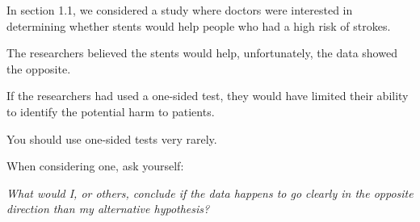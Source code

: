 \documentclass{beamer}
\begin{document}
\begin{frame}
  \begin{example}
    In section 1.1, we considered a study where doctors were interested in determining whether stents would help people who had a high risk of strokes.\pause

    \vspace{1mm}
    The researchers believed the stents would help, unfortunately, the data showed the opposite.\pause

    \vspace{1mm}
    If the researchers had used a one-sided test, they would have limited their ability to identify the potential harm to patients.
  \end{example}\pause

  \begin{note}
    You should use one-sided tests very rarely.\pause

    \vspace{1mm}
    When considering one, ask yourself:
    \begin{center}
      \emph{What would I, or others, conclude if the data happens to go clearly in the opposite direction than my alternative hypothesis?}
    \end{center}
  \end{note}
\end{frame}
\end{document}

